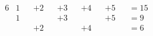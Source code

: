 \begin{alignat*}{6}
 &1 & &+2 & &+3 & &+4 & &+5 & &=15 \\
 &1 & &   & &+3 & &   & &+5 & &=9 \\
 &  & &+2 & &   & &+4 & &   & &=6
\end{alignat*}
